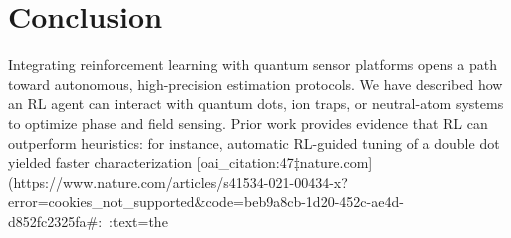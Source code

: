 \documentclass[12pt]{article}
\begin{document}
\section{Conclusion}
Integrating reinforcement learning with quantum sensor platforms opens a path toward autonomous, high-precision estimation protocols.  We have described how an RL agent can interact with quantum dots, ion traps, or neutral-atom systems to optimize phase and field sensing.  Prior work provides evidence that RL can outperform heuristics: for instance, automatic RL-guided tuning of a double dot yielded faster characterization [oai_citation:47‡nature.com](https://www.nature.com/articles/s41534-021-00434-x?error=cookies_not_supported&code=beb9a8cb-1d20-452c-ae4d-d852fc2325fa#:~:text=the%



\end{document}
